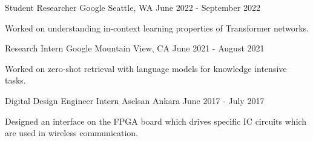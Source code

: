 

\begin{cventries}

  \cventry
    {Student Researcher} %
    {Google} %
    {Seattle, WA} %
    {June 2022 - September 2022} %
    {
      \begin{cvitems} %
        \item {Worked on understanding in-context learning properties of Transformer networks.}
      \end{cvitems}
    }


  \cventry
    {Research Intern} %
    {Google} %
    {Mountain View, CA} %
    {June 2021 - August 2021} %
    {
      \begin{cvitems} %
        \item {Worked on zero-shot retrieval with language models for knowledge intensive tasks.}
      \end{cvitems}
    }


  \cventry
    {Digital Design Engineer Intern} %
    {Aselsan} %
    {Ankara} %
    {June 2017 - July 2017} %
    {
      \begin{cvitems} %
        \item {Designed an interface on the FPGA board which drives specific IC circuits which are used in wireless communication.}
      \end{cvitems}
    }


\end{cventries}
